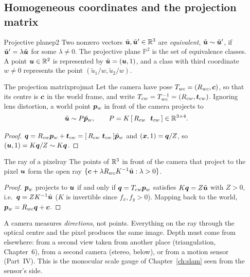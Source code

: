 \subsection{Homogeneous coordinates and the projection matrix}

\begin{definition}{Projective plane}{p2}
Two nonzero vectors $\tilde{\bm{u}},\tilde{\bm{u}}'\in\mathbb{R}^3$ are
\emph{equivalent}, $\tilde{\bm{u}}\sim\tilde{\bm{u}}'$, if
$\tilde{\bm{u}}'=\lambda\tilde{\bm{u}}$ for some $\lambda\neq0$. The
projective plane $\mathbb{P}^2$ is the set of equivalence classes. A point
$\bm{u}\in\mathbb{R}^2$ is represented by $\tilde{\bm{u}}=(\bm{u},1)$, and a
class with third coordinate $w\neq0$ represents the point
$(\tilde u_1/w,\tilde u_2/w)$.
\end{definition}

\begin{proposition}{The projection matrix}{projmat}
Let the camera have pose $T_{wc}=(R_{wc},\bm{c})$, so that its centre
is $\bm{c}$ in the world frame, and write $T_{cw}=T_{wc}^{-1}=
(R_{cw},\bm{t}_{cw})$. Ignoring lens distortion, a world point
$\bm{p}_w$ in front of the camera projects to
\begin{equation}\label{eq:projmat}
\tilde{\bm{u}}\sim P\tilde{\bm{p}}_w,\qquad
P=K\,[\,R_{cw}\ \ \bm{t}_{cw}\,]\in\mathbb{R}^{3\times4}.
\end{equation}
\end{proposition}

\begin{proof}
$\vect{q}=R_{cw}\p_w+\vect{t}_{cw}=[\,R_{cw}\ \vect{t}_{cw}\,]\tilde\p_w$
and $(\bm{x},1)=\bm{q}/Z$, so $(\bm{u},1)=K\bm{q}/Z\sim
K\bm{q}$.
\end{proof}

\begin{lemma}{The ray of a pixel}{ray}
The points of $\mathbb{R}^3$ in front of the camera that project to the pixel
$\bm{u}$ form the open ray
$\{\bm{c}+\lambda R_{wc}K^{-1}\tilde{\bm{u}}:\lambda>0\}$.
\end{lemma}

\begin{proof}
$\bm{p}_w$ projects to $\bm{u}$ if and only if $\bm{q}=T_{cw}\bm{p}_w$
satisfies $K\bm{q}=Z\tilde{\bm{u}}$ with $Z>0$, i.e.\
$\bm{q}=Z K^{-1}\tilde{\bm{u}}$ ($K$ is invertible since
$f_x,f_y>0$). Mapping back to the world, $\bm{p}_w=R_{wc}\bm{q}+\bm{c}$.
\end{proof}

\begin{inwords}
A camera measures \emph{directions}, not points. Everything on the ray
through the optical centre and the pixel produces the same image. Depth
must come from elsewhere: from a second view taken from another place
(triangulation, Chapter~6), from a second camera (stereo, below), or
from a motion sensor (Part~IV). This is the monocular scale gauge of
Chapter~\ref{ch:slam} seen from the sensor's side.
\end{inwords}


